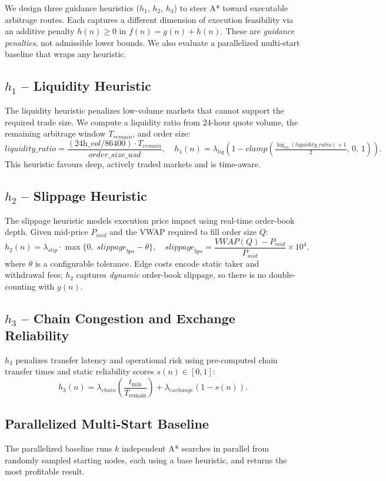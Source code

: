 We design three guidance heuristics ($h_1$, $h_2$, $h_3$) to steer A* toward executable arbitrage routes. Each captures a different dimension of execution feasibility via an additive penalty $h(n) \geq 0$ in $f(n) = g(n) + h(n)$. These are \emph{guidance penalties}, not admissible lower bounds. We also evaluate a parallelized multi-start baseline that wraps any heuristic.

\subsection{$h_1$ -- Liquidity Heuristic}

The liquidity heuristic penalizes low-volume markets that cannot support the required trade size. We compute a liquidity ratio from 24-hour quote volume, the remaining arbitrage window $T_{\textit{remain}}$, and order size:
\[
\textit{liquidity\_ratio} = \frac{(\textit{24h\_vol} / 86400) \cdot T_{\textit{remain}}}{\textit{order\_size\_usd}},
\quad
h_1(n) = \lambda_{liq}\!\left(1 - \textit{clamp}\!\left(\tfrac{\log_{10}(\textit{liquidity\_ratio})+1}{2},\,0,\,1\right)\right).
\]
This heuristic favours deep, actively traded markets and is time-aware.

\subsection{$h_2$ -- Slippage Heuristic}

The slippage heuristic models execution price impact using real-time order-book depth. Given mid-price $P_{mid}$ and the VWAP required to fill order size $Q$:
\[
h_2(n) = \lambda_{slip} \cdot \max\!\bigl\{0,\; \textit{slippage}_{bps} - \theta\bigr\},
\quad
\textit{slippage}_{bps} = \frac{\textit{VWAP}(Q) - P_{mid}}{P_{mid}} \times 10^4,
\]
where $\theta$ is a configurable tolerance. Edge costs encode static taker and withdrawal fees; $h_2$ captures \emph{dynamic} order-book slippage, so there is no double-counting with $g(n)$.

\subsection{$h_3$ -- Chain Congestion and Exchange Reliability}

$h_3$ penalizes transfer latency and operational risk using pre-computed chain transfer times and static reliability scores $s(n) \in [0,1]$:
\[
h_3(n) = \lambda_{chain}\!\left(\frac{t_{\min}}{T_{\text{remain}}}\right) + \lambda_{exchange}\!\left(1 - s(n)\right).
\]

\subsection{Parallelized Multi-Start Baseline}

The parallelized baseline runs $k$ independent A* searches in parallel from randomly sampled starting nodes, each using a base heuristic, and returns the most profitable result.

